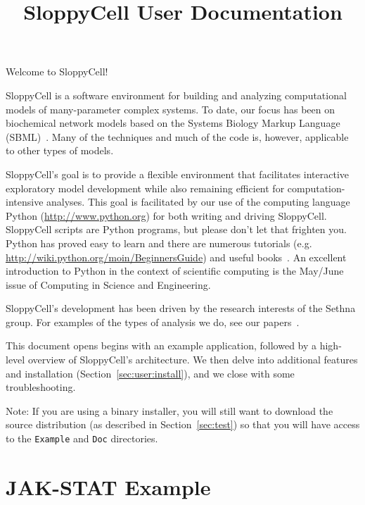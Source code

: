 \documentclass[12pt]{article}
\newcommand{\shell}[1]{\lstinline[language=csh, showstringspaces=False]!#1!}
\begin{document}
\title{SloppyCell User Documentation}
\maketitle
\tableofcontents
\clearpage

Welcome to SloppyCell!

SloppyCell is a software environment for building and analyzing computational models of many-parameter complex systems.
To date, our focus has been on biochemical network models based on the Systems Biology Markup Language (SBML)~\cite{bib:Hucka2003}.
Many of the techniques and much of the code is, however, applicable to other types of models.

SloppyCell's goal is to provide a flexible environment that facilitates interactive exploratory model development while also remaining efficient for computation-intensive analyses.
This goal is facilitated by our use of the computing language Python (\url{http://www.python.org}) for both writing and driving SloppyCell.
SloppyCell scripts are Python programs, but please don't let that frighten you.
Python has proved easy to learn and there are numerous tutorials (e.g. \url{http://wiki.python.org/moin/BeginnersGuide}) and useful books~\cite{bib:Lutz2003}.
An excellent introduction to Python in the context of scientific computing is the May/June issue of Computing in Science and Engineering.

SloppyCell's development has been driven by the research interests of the Sethna group. For examples of the types of analysis we do, see our papers~\cite{bib:Brown2003a, bib:Brown2004, bib:Frederiksen2004, bib:Waterfall2006, bib:Casey2007, bib:Gutenkunst2007, bib:Gutenkunst2007a, bib:GutenkunstPhD}.

This document opens begins with an example application, followed by a high-level overview of SloppyCell's architecture.
We then delve into additional features and installation (Section~\ref{sec:user:install}), and we close with some troubleshooting.

Note: If you are using a binary installer, you will still want to download the source distribution (as described in Section~\ref{sec:test}) so that you will have access to the \shell{Example} and \shell{Doc} directories.

\section{JAK-STAT Example\label{sec:user:example}}
\end{document}

